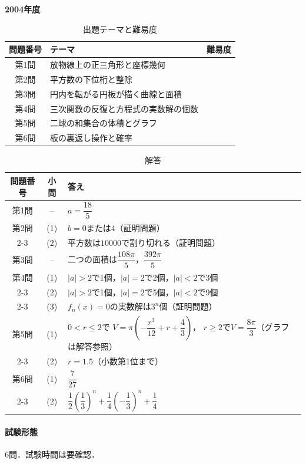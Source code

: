 \documentclass[../../main.tex]{subfiles}
\begin{document}
\begin{center}
  {\fontsize{48pt}{58pt}\selectfont \textbf{2004}\normalsize\textbf{年度}}
\end{center}

\begin{table}[htb]
  \centering
  \caption{出題テーマと難易度}
  \begin{tabular}{|c|p{9cm}|c|}
    \hline
    \textbf{問題番号} & \textbf{テーマ} & \textbf{難易度} \\
    \hline
    第1問 & 放物線上の正三角形と座標幾何 & \\
    \hline
    第2問 & 平方数の下位桁と整除 & \\
    \hline
    第3問 & 円内を転がる円板が描く曲線と面積 & \\
    \hline
    第4問 & 三次関数の反復と方程式の実数解の個数 & \\
    \hline
    第5問 & 二球の和集合の体積とグラフ & \\
    \hline
    第6問 & 板の裏返し操作と確率 & \\
    \hline
  \end{tabular}
\end{table}

\begin{table}[htb]
  \centering
  \caption{解答}
  \renewcommand{\arraystretch}{1.4}
  \begin{tabular}{|c|c|p{9cm}|}
    \hline
    \textbf{問題番号} & \textbf{小問} & \textbf{答え} \\
    \hline
    第1問 & -- & $a=\dfrac{18}{5}$ \\
    \hline
    第2問 & (1) & $b=0$または$4$（証明問題） \\
    \cline{2-3}
    & (2) & 平方数は$10000$で割り切れる（証明問題） \\
    \hline
    第3問 & -- & 二つの面積は$\dfrac{108\pi}{5}$，$\dfrac{392\pi}{5}$ \\
    \hline
    第4問 & (1) & $|a|>2$で1個，$|a|=2$で2個，$|a|<2$で3個 \\
    \cline{2-3}
    & (2) & $|a|>2$で1個，$|a|=2$で5個，$|a|<2$で9個 \\
    \cline{2-3}
    & (3) & $f_n(x)=0$の実数解は$3^n$個（証明問題） \\
    \hline
    第5問 & (1) & $0<r\le2$で
    $V=\pi\left(-\dfrac{r^3}{12}+r+\dfrac{4}{3}\right)$，
    $r\ge2$で$V=\dfrac{8\pi}{3}$（グラフは解答参照） \\
    \cline{2-3}
    & (2) & $r=1.5$（小数第1位まで） \\
    \hline
    第6問 & (1) & $\dfrac{7}{27}$ \\
    \cline{2-3}
    & (2) & $\dfrac{1}{2}\left(\dfrac{1}{3}\right)^n
    +\dfrac{1}{4}\left(-\dfrac{1}{3}\right)^n+\dfrac{1}{4}$ \\
    \hline
  \end{tabular}
\end{table}

\paragraph{試験形態}
6問．試験時間は要確認．
\end{document}
